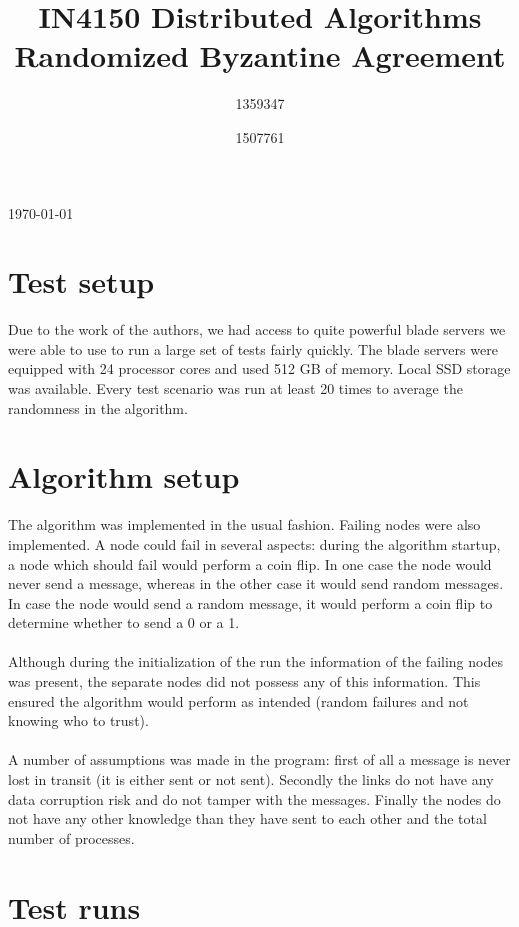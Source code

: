 \documentclass[a4paper]{IEEEtran}
\title{IN4150 Distributed Algorithms\\Randomized Byzantine Agreement}
\author{\IEEEauthorblockN{Peter van Buul}
1359347\\
\and
\IEEEauthorblockN{Rogier Slag}
1507761\\
}
\begin{document}
\maketitle
\begin{center}
\today
\end{center}

\section{Test setup}

Due to the work of the authors, we had access to quite powerful blade servers we were able to use to run a large set of tests fairly quickly.
The blade servers were equipped with 24 processor cores and used 512 GB of memory.
Local SSD storage was available. 
Every test scenario was run at least 20 times to average the randomness in the algorithm.

\section{Algorithm setup}

The algorithm was implemented in the usual fashion.
Failing nodes were also implemented.
A node could fail in several aspects:
during the algorithm startup, a node which should fail would perform a coin flip.
In one case the node would never send a message, whereas in the other case it would send random messages.
In case the node would send a random message,
it would perform a coin flip to determine whether to send a 0 or a 1.
\\
\\
Although during the initialization of the run the information of the failing nodes was present,
the separate nodes did not possess any of this information.
This ensured the algorithm would perform as intended (random failures and not knowing who to trust).
\\
\\
A number of assumptions was made in the program:
first of all a message is never lost in transit (it is either sent or not sent).
Secondly the links do not have any data corruption risk and do not tamper with the messages.
Finally the nodes do not have any other knowledge than they have sent to each other and the total number of processes.

\section{Test runs}
\end{document}
